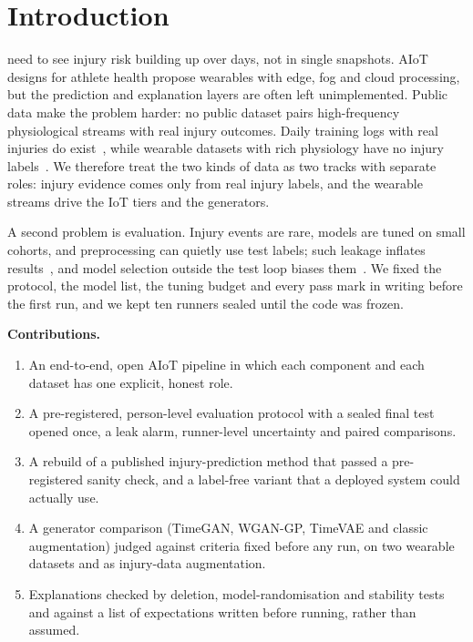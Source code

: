 \documentclass{ieeeaccess}
\begin{document}
\titlepgskip=-15pt

\maketitle

\section{Introduction}
\label{sec:introduction}
 need to see injury risk building up over days, not in single snapshots.
AIoT designs for athlete health propose wearables with edge, fog and cloud processing, but the
prediction and explanation layers are often left unimplemented. Public data
make the problem harder: no public dataset pairs high-frequency physiological streams with real
injury outcomes. Daily training logs with real injuries do exist~\cite{lovdal2021,lovdal2021data},
while wearable datasets with rich physiology have no injury labels~\cite{reiss2012,schmidt2018}.
We therefore treat the two kinds of data as two tracks with separate roles: injury evidence comes
only from real injury labels, and the wearable streams drive the IoT tiers and the generators.

A second problem is evaluation. Injury events are rare, models are tuned on small cohorts, and
preprocessing can quietly use test labels; such leakage inflates results~\cite{kapoor2023}, and
model selection outside the test loop biases them~\cite{varma2006,cawley2010}. We fixed the
protocol, the model list, the tuning budget and every pass mark in writing before the first run,
and we kept ten runners sealed until the code was frozen.

\textbf{Contributions.}
\begin{enumerate}
\item An end-to-end, open AIoT pipeline in which each component and each dataset has one
explicit, honest role.
\item A pre-registered, person-level evaluation protocol with a sealed final test opened once,
a leak alarm, runner-level uncertainty and paired comparisons.
\item A rebuild of a published injury-prediction method that passed a pre-registered sanity
check, and a label-free variant that a deployed system could actually use.
\item A generator comparison (TimeGAN, WGAN-GP, TimeVAE and classic augmentation) judged against
criteria fixed before any run, on two wearable datasets and as injury-data augmentation.
\item Explanations checked by deletion, model-randomisation and stability tests and against a
list of expectations written before running, rather than assumed.
\end{enumerate}
\end{document}
